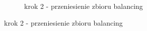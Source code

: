 \begin{figure}[h]
\begin{subfigure}{.5\textwidth}
    \caption[short]{krok 2 - przeniesienie zbioru balancing}
\end{subfigure}%


\end{figure}
